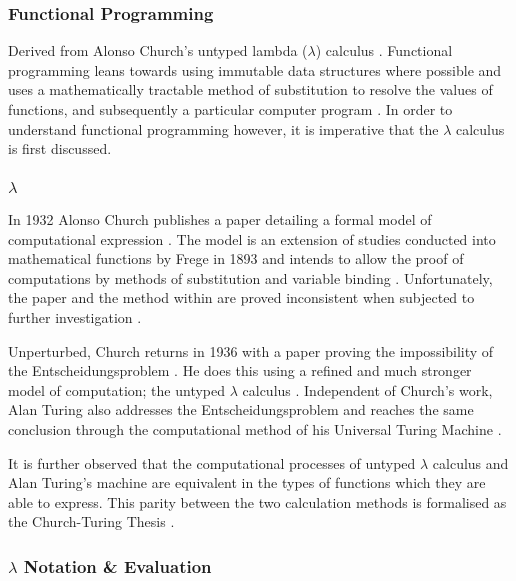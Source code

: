 \documentclass[12pt,a4paper]{article}
\begin{document}
\subsubsection{Functional Programming}

Derived from Alonso Church's untyped lambda ($\lambda$) calculus \cite{church1936}. Functional programming leans towards using immutable data structures where possible and uses a mathematically tractable method of substitution to resolve the values of functions, and subsequently a particular computer program  \cite{structureAndInterpretation,ImperativeFunctional}. In order to understand functional programming however, it is imperative that the $\lambda$ calculus is first discussed.

\subsubsection{$\lambda$}

In 1932 Alonso Church publishes a paper detailing a formal model of computational expression \cite{church1932}. The model is an extension of studies conducted into mathematical functions by Frege in 1893 and intends to allow the proof of computations by methods of substitution and variable binding \cite{lambdaHighlights}. Unfortunately, the paper and the method within are proved inconsistent when subjected to further investigation \cite{lambdaHighlights}.

Unperturbed, Church returns in 1936 with a paper proving the impossibility of the Entscheidungsproblem \cite{church1936,churchTuringThesis}. He does this using a refined and much stronger model of computation; the untyped $\lambda$ calculus \cite{church1936}. Independent of Church's work, Alan Turing also addresses the Entscheidungsproblem and reaches the same conclusion through the computational method of his Universal Turing Machine \cite{turing1936,churchTuringThesis}.

It is further observed that the computational processes of untyped $\lambda$ calculus and Alan Turing's machine are equivalent in the types of functions which they are able to express. This parity between the two calculation methods is formalised as the Church-Turing Thesis \cite{churchTuringThesis,ImperativeFunctional}.

\subsubsection{$\lambda$ Notation \& Evaluation}
\end{document}
